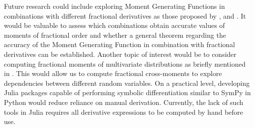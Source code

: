 Future research could include exploring Moment Generating Functions in combinations with different fractional derivatives as those proposed by \cite{hadamard1892}, \cite{riesz1949} and \cite{marchaud1927}. It would be valuable to assess which combinations obtain accurate values of moments of fractional order and whether a general theorem regarding the accuracy of the Moment Generating Function in combination with fractional derivatives can be established. Another topic of interest would be to consider computing fractional moments of multivariate distributions as briefly mentioned in \cite{hansen2024}. This would allow us to compute fractional cross-moments to explore dependencies between different random variables. On a practical level, developing Julia packages capable of performing symbolic differentiation similar to SymPy in Python \cite{meurer2017} would reduce reliance on manual derivation. Currently, the lack of such tools in Julia requires all derivative expressions to be computed by hand before use.